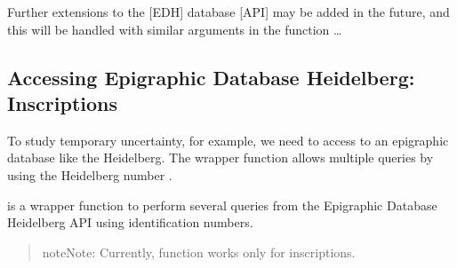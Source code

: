 \documentclass[a4paper,12pt,english]{sphinxhowto}
\begin{document}
Further extensions to the {[}EDH{]} database {[}API{]} may be added in the future, and this will be
handled with similar arguments in the  function …



\subsection{Accessing Epigraphic Database Heidelberg: Inscriptions}
\label{\detokenize{Epigraphic:accessing-epigraphic-database-heidelberg-inscriptions}}

\begin{fulllineitems}
\label{\detokenize{Epigraphic:get.edhw}}
\end{fulllineitems}


\begin{sphinxVerbatim}[commandchars=\\\{\},formatcom=\footnotesize]
  
\end{sphinxVerbatim}

To study temporary uncertainty, for example, we need to access to an epigraphic database like the Heidelberg.
The wrapper function  allows multiple queries by using the Heidelberg number .

 is a wrapper function to perform several queries from the Epigraphic Database Heidelberg API using
identification numbers.
\begin{quote}

\begin{sphinxadmonition}{note}{Note:}
Currently, function  works only for inscriptions.
\end{sphinxadmonition}
\end{quote}
\end{document}
